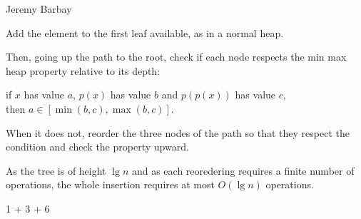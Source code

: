 \begin{enumerate}
\begin{solution}
  \begin{authorship}Jeremy Barbay\end{authorship}
  Add the element to the first leaf available, as in a normal heap.

  Then, going up the path to the root, check if each node respects the
  min max heap property relative to its depth: 
  \begin{center}
    if $x$ has value $a$, $p(x)$ has value $b$ and $p(p(x))$ has value
    $c$, \\
    then $a\in[\min(b,c),\max(b,c)]$.
  \end{center}
  When it does not, reorder the three nodes of the path so that they
  respect the condition and check the property upward.

  As the tree is of height $\lg n$ and as each reoredering requires a
  finite number of operations, the whole insertion requires at most
  $O(\lg n)$ operations.
\end{solution}

\end{enumerate}

\begin{spaceForAnswer}\pagebreak\end{spaceForAnswer}

\begin{markingScheme}
1 + 3 + 6
\end{markingScheme}

